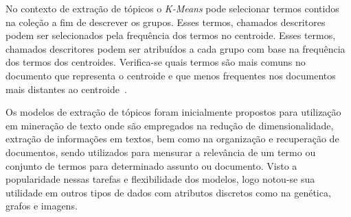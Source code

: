 No contexto de extração de tópicos o \textit{K-Means} pode selecionar termos contidos na coleção a fim de descrever os grupos. Esses termos, chamados descritores podem ser selecionados pela frequência dos termos no centroide. 
%
Esses termos, chamados descritores podem ser atribuídos a cada grupo com base na frequência dos termos dos centroides. Verifica-se quais termos são mais comuns no documento que representa o centroide e que menos frequentes nos documentos mais distantes ao centroide~\cite{Pema2017, Bui2017, Rossi2011, Santos2010a, Manning2008}. 

Os modelos de extração de tópicos foram inicialmente propostos para utilização em mineração de texto onde são empregados na redução de dimensionalidade, extração de informações em textos, bem como na organização e recuperação de documentos, sendo utilizados para mensurar a relevância de um termo ou conjunto de termos para determinado assunto ou documento. Visto a popularidade nessas tarefas e flexibilidade dos modelos, logo notou-se sua utilidade em outros tipos de dados com atributos discretos como na genética, grafos e imagens. 


